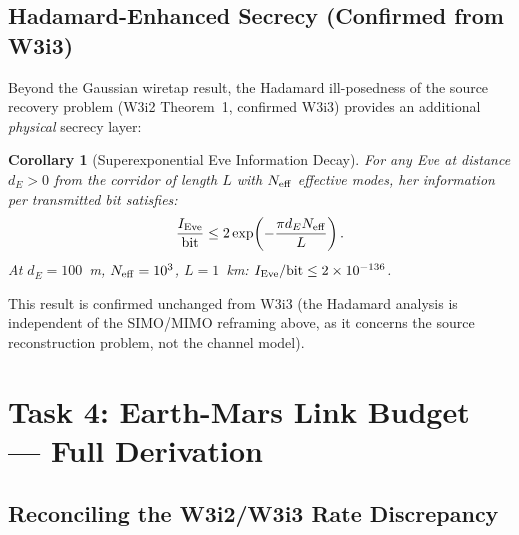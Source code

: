 \documentclass[aps,prd,twocolumn,superscriptaddress,nofootinbib]{revtex4-2}
\newtheorem{corollary}[theorem]{Corollary}
\begin{document}
\subsection{Hadamard-Enhanced Secrecy (Confirmed from W3i3)}

Beyond the Gaussian wiretap result, the Hadamard ill-posedness of the
source recovery problem (W3i2 Theorem~1, confirmed W3i3) provides an
additional \emph{physical} secrecy layer:

\begin{corollary}[Superexponential Eve Information Decay]
\label{cor:hadamard}
For any Eve at distance $d_E > 0$ from the corridor of length $L$ with
$N_{\rm eff}$ effective modes, her information per transmitted bit satisfies:
\begin{equation}
\frac{I_{\rm Eve}}{\text{bit}} \leq 2\exp\!\left(-\frac{\pi d_E N_{\rm eff}}{L}\right).
\label{eq:Hadamard-bound}
\end{equation}
At $d_E = 100$~m, $N_{\rm eff} = 10^3$, $L = 1$~km:
$I_{\rm Eve}/\text{bit} \leq 2\times 10^{-136}$.
\end{corollary}

This result is confirmed unchanged from W3i3 (the Hadamard analysis is
independent of the SIMO/MIMO reframing above, as it concerns the source
reconstruction problem, not the channel model).

\section{Task 4: Earth-Mars Link Budget --- Full Derivation}
\label{sec:link-budget}

\subsection{Reconciling the W3i2/W3i3 Rate Discrepancy}
\end{document}
